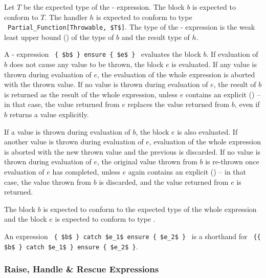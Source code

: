Let $T$ be the expected type of the - expression. The block $b$ is expected to conform to $T$. The handler $h$ is expected to conform to type ~\lstinline!Partial_Function[Throwable, $T$]!. The type of the - expression is the weak least upper bound () of the type of $b$ and the result type of $h$. 

A - expression ~\lstinline!{ $b$ } ensure { $e$ }!~ evaluates the block $b$. If evaluation of $b$ does not cause any value to be thrown, the block $e$ is evaluated. If any value is thrown during evaluation of $e$, the evaluation of the whole expression is aborted with the thrown value. If no value is thrown during evaluation of $e$, the result of $b$ is returned as the result of the whole expression, unless $e$ contains an explicit  () -- in that case, the value returned from $e$ replaces the value returned from $b$, even if $b$ returns a value explicitly. 

If a value is thrown during evaluation of $b$, the  block $e$ is also evaluated. If another value is thrown during evaluation of $e$, evaluation of the whole expression is aborted with the new thrown value and the previous is discarded. If no value is thrown during evaluation of $e$, the original value thrown from $b$ is re-thrown once evaluation of $e$ has completed, unless $e$ again contains an explicit  () -- in that case, the value thrown from $b$ is discarded, and the value returned from $e$ is returned. 


The block $b$ is expected to conform to the expected type of the whole expression and the  block $e$ is expected to conform to type . 

An expression ~\lstinline!{ $b$ } catch $e_1$ ensure { $e_2$ }!~ is a shorthand for ~\lstinline!{{ $b$ } catch $e_1$ } ensure { $e_2$ }!. 






\subsubsection{Raise, Handle \& Rescue Expressions}

